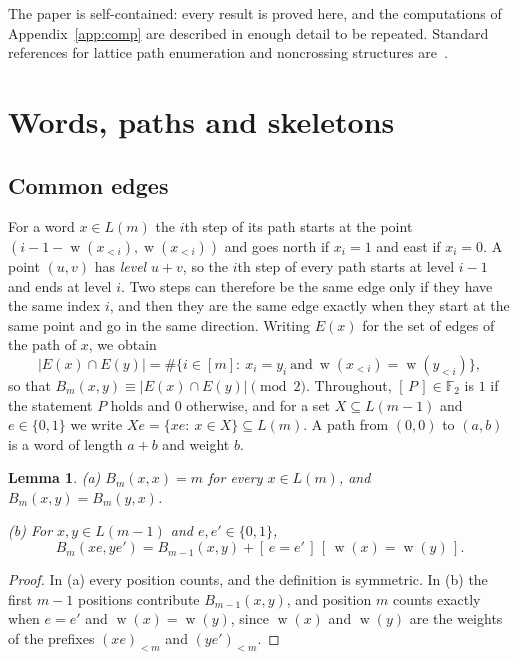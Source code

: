 \documentclass[11pt]{amsart}
\newtheorem{lemma}[theorem]{Lemma}
\theoremstyle{definition}
\theoremstyle{remark}
\numberwithin{equation}{section}
\newcommand{\F}{\mathbb{F}}
\newcommand{\Iv}[1]{[\,#1\,]}
\DeclareMathOperator{\wt}{w}
\begin{document}
The paper is self-contained: every result is proved here, and the computations of Appendix~\ref{app:comp} are described in enough detail to be repeated. Standard references for lattice path enumeration and noncrossing structures are~\cite{Kr,De,Si,Kre}.

\section{Words, paths and skeletons}\label{sec:skeletons}

\subsection{Common edges}

For a word $x\in L(m)$ the $i$th step of its path starts at the point $(i-1-\wt(x_{<i}),\wt(x_{<i}))$ and goes north if $x_i=1$ and east if $x_i=0$. A point $(u,v)$ has \emph{level} $u+v$, so the $i$th step of every path starts at level $i-1$ and ends at level $i$. Two steps can therefore be the same edge only if they have the same index $i$, and then they are the same edge exactly when they start at the same point and go in the same direction. Writing $E(x)$ for the set of edges of the path of $x$, we obtain
\begin{equation}\label{eq:common}
|E(x)\cap E(y)|=\#\{i\in[m]:\ x_i=y_i\ \text{and}\ \wt(x_{<i})=\wt(y_{<i})\},
\end{equation}
so that $B_m(x,y)\equiv|E(x)\cap E(y)|\pmod 2$. Throughout, $\Iv{P}\in\F_2$ is $1$ if the statement $P$ holds and $0$ otherwise, and for a set $X\subseteq L(m-1)$ and $e\in\{0,1\}$ we write $Xe=\{xe:\ x\in X\}\subseteq L(m)$. A path from $(0,0)$ to $(a,b)$ is a word of length $a+b$ and weight $b$.

\begin{lemma}\label{lem:basic}
\textup{(a)} $B_m(x,x)=m$ for every $x\in L(m)$, and $B_m(x,y)=B_m(y,x)$.

\textup{(b)} For $x,y\in L(m-1)$ and $e,e'\in\{0,1\}$,
\[
B_m(xe,ye')=B_{m-1}(x,y)+\Iv{e=e'}\,\Iv{\wt(x)=\wt(y)} .
\]
\end{lemma}

\begin{proof}
In (a) every position counts, and the definition is symmetric. In (b) the first $m-1$ positions contribute $B_{m-1}(x,y)$, and position $m$ counts exactly when $e=e'$ and $\wt(x)=\wt(y)$, since $\wt(x)$ and $\wt(y)$ are the weights of the prefixes $(xe)_{<m}$ and $(ye')_{<m}$.
\end{proof}
\end{document}
